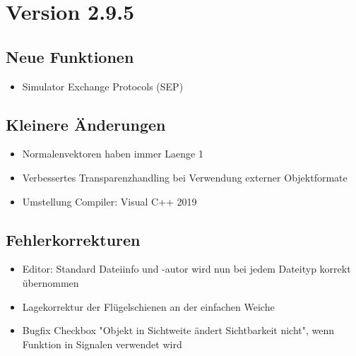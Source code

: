 \section{Version 2.9.5}
\subsection{Neue Funktionen}
\begin{itemize}
    \item Simulator Exchange Protocols (SEP)
\end{itemize}


\subsection{Kleinere Änderungen}
\begin{itemize}
\item Normalenvektoren haben immer Laenge 1
\item Verbessertes Transparenzhandling bei Verwendung externer Objektformate
\item Umstellung Compiler: Visual C++ 2019
\end{itemize}

\subsection{Fehlerkorrekturen}
\begin{itemize}
\item Editor: Standard Dateiinfo und -autor wird nun bei jedem Dateityp korrekt übernommen
\item Lagekorrektur der Flügelschienen an der einfachen Weiche
\item Bugfix Checkbox "Objekt in Sichtweite ändert Sichtbarkeit nicht", wenn Funktion in Signalen verwendet wird
\end{itemize}
